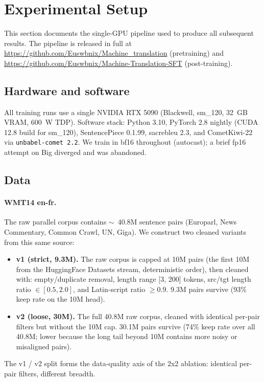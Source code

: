 \section{Experimental Setup}
\label{sec:setup}

This section documents the single-GPU pipeline used to produce all subsequent results. The pipeline is released in full at \url{https://github.com/Euswbnix/Machine_translation} (pretraining) and \url{https://github.com/Euswbnix/Machine-Translation-SFT} (post-training).

\subsection{Hardware and software}
All training runs use a single NVIDIA RTX 5090 (Blackwell, sm\_120, 32~GB VRAM, 600~W TDP). Software stack: Python 3.10, PyTorch 2.8 nightly (CUDA 12.8 build for sm\_120), SentencePiece 0.1.99, sacrebleu 2.3, and CometKiwi-22 via \texttt{unbabel-comet 2.2}. We train in bf16 throughout (autocast); a brief fp16 attempt on Big diverged and was abandoned.

\subsection{Data}
\paragraph{WMT14 en-fr.} The raw parallel corpus contains $\sim$~40.8M sentence pairs (Europarl, News Commentary, Common Crawl, UN, Giga). We construct two cleaned variants from this same source:
\begin{itemize}
\item \textbf{v1 (strict, 9.3M).} The raw corpus is capped at 10M pairs (the first 10M from the HuggingFace Datasets stream, deterministic order), then cleaned with: empty/duplicate removal, length range [3, 200] tokens, src/tgt length ratio $\in [0.5, 2.0]$, and Latin-script ratio $\geq 0.9$. 9.3M pairs survive (93\% keep rate on the 10M head).
\item \textbf{v2 (loose, 30M).} The full 40.8M raw corpus, cleaned with identical per-pair filters but without the 10M cap. 30.1M pairs survive (74\% keep rate over all 40.8M; lower because the long tail beyond 10M contains more noisy or misaligned pairs).
\end{itemize}
The v1 / v2 split forms the data-quality axis of the 2x2 ablation: identical per-pair filters, different breadth.

